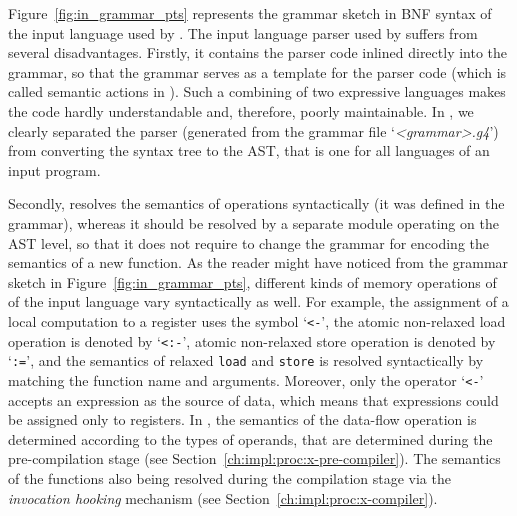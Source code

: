 Figure~\ref{fig:in_grammar_pts} represents the grammar sketch in BNF syntax of the input language used by \porthos[1].
The input language parser used by \oldporthos{} suffers from several disadvantages.
Firstly, it contains the parser code inlined directly into the grammar, so that the grammar serves as a template for the parser code (which is called semantic actions in ).
Such a combining of two expressive languages makes the code hardly understandable and, therefore, poorly maintainable.
In \porthos[2], we clearly separated the parser (generated from the grammar file `\textit{<grammar>.g4}') from converting the  syntax tree to the AST, that is one for all languages of an input program.

Secondly, \porthos{} resolves the semantics of operations syntactically (it was defined in the  grammar), whereas it should be resolved by a separate module operating on the AST level, %
%
%
so that it does not require to change the grammar for encoding the semantics of a new function. %
As the reader might have noticed from the grammar sketch in Figure~\ref{fig:in_grammar_pts}, different kinds of memory operations of of the \oldporthos{} input language vary syntactically as well.
For example, the assignment of a local computation to a register uses the symbol `\lstinline{<-}', the atomic non-relaxed load operation is denoted by `\lstinline{<:-}', atomic non-relaxed store operation is denoted by `\lstinline{:=}', and the semantics of relaxed \lstinline{load} and \lstinline{store} is resolved syntactically by matching the function name and arguments.
Moreover, only the operator `\lstinline{<-}' accepts an expression as the source of data, which means that expressions could be assigned only to registers.
In \porthos[2], the semantics of the data-flow operation is determined according to the types of operands, that are determined during the pre-compilation stage (see Section~\ref{ch:impl:proc:x-pre-compiler}).
The semantics of the functions also being resolved during the compilation stage via the \textit{invocation hooking} mechanism (see Section~\ref{ch:impl:proc:x-compiler}).

